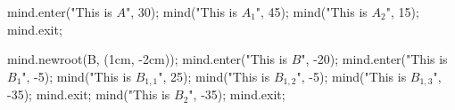 \usemodule[mindmap]
\startMPpage
mind.enter("This is $A$", 30);
    mind("This is $A_1$", 45);
    mind("This is $A_2$", 15);
mind.exit;

mind.newroot(B, (1cm, -2cm));
mind.enter("This is $B$", -20);
    mind.enter("This is $B_{1}$", -5);
        mind("This is $B_{1,1}$", 25);
        mind("This is $B_{1,2}$", -5);
        mind("This is $B_{1,3}$", -35);
    mind.exit;
    mind("This is $B_2$", -35);
mind.exit;
\stopMPpage

